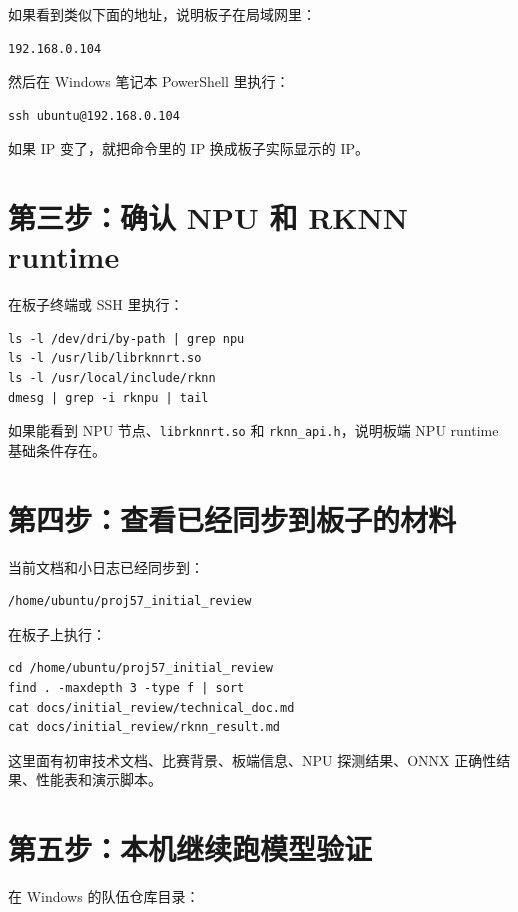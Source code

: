 \documentclass[UTF8,a4paper,11pt]{ctexart}
\begin{document}
如果看到类似下面的地址，说明板子在局域网里：

\begin{verbatim}
192.168.0.104
\end{verbatim}

然后在 Windows 笔记本 PowerShell 里执行：

\begin{verbatim}
ssh ubuntu@192.168.0.104
\end{verbatim}

如果 IP 变了，就把命令里的 IP 换成板子实际显示的 IP。

\section{第三步：确认 NPU 和 RKNN runtime}

在板子终端或 SSH 里执行：

\begin{verbatim}
ls -l /dev/dri/by-path | grep npu
ls -l /usr/lib/librknnrt.so
ls -l /usr/local/include/rknn
dmesg | grep -i rknpu | tail
\end{verbatim}

如果能看到 NPU 节点、\verb|librknnrt.so| 和 \verb|rknn_api.h|，说明板端 NPU runtime 基础条件存在。

\section{第四步：查看已经同步到板子的材料}

当前文档和小日志已经同步到：

\begin{verbatim}
/home/ubuntu/proj57_initial_review
\end{verbatim}

在板子上执行：

\begin{verbatim}
cd /home/ubuntu/proj57_initial_review
find . -maxdepth 3 -type f | sort
cat docs/initial_review/technical_doc.md
cat docs/initial_review/rknn_result.md
\end{verbatim}

这里面有初审技术文档、比赛背景、板端信息、NPU 探测结果、ONNX 正确性结果、性能表和演示脚本。

\section{第五步：本机继续跑模型验证}

在 Windows 的队伍仓库目录：
\end{document}
